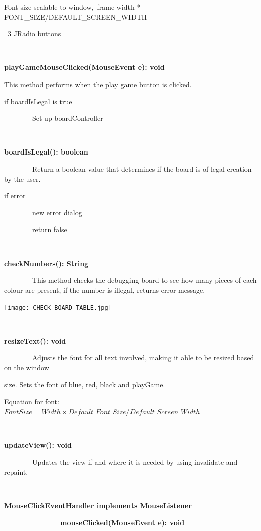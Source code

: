 \documentclass{article}
\begin{document}
{{Font size scalable to window,}{~frame width *
FONT\_SIZE/DEFAULT\_SCREEN\_WIDTH}

{~3 JRadio buttons}

{~}

{\textbf{playGameMouseClicked(MouseEvent e): void}}

{This method performs when the play game button is clicked. }

{if boardIsLegal is true}

{~~~~~~~~Set up boardController}

{~}

{\textbf{boardIsLegal(): boolean}}

{~~~~~~~~Return a boolean value that determines if the board is of legal
creation by the user.}{~~~~~~~~}

{if error}

{~~~~~~~~new error dialog}

{~~~~~~~~return false}

{}

{}

{}

{~}

{\textbf{checkNumbers(): String}}

{~~~~~~~~This method checks the debugging board to see how many pieces of each colour are present, if the number is illegal, returns error message. }

\texttt{[image: CHECK\_BOARD\_TABLE.jpg]}

{~}

{\textbf{resizeText(): void}}

{~~~~~~~~Adjusts the font for all text involved, making it able to be
resized based on the window}

{size. Sets the font of blue, red, black and playGame.}

{Equation for font: \(Font Size = Width \times Default\_Font\_Size / Default\_Screen\_Width\)}

{~~~~~~~~}

{\textbf{updateView(): void}}

{~~~~~~~~Updates the view if and where it is needed by using invalidate
and repaint.}

{~~~~~~~~~~~~~~~~}

{\textbf{MouseClickEventHandler implements MouseListener}}

{~~~~~~~~~~~~~~~~\textbf{mouseClicked(MouseEvent e): void}}

}
\end{document}
